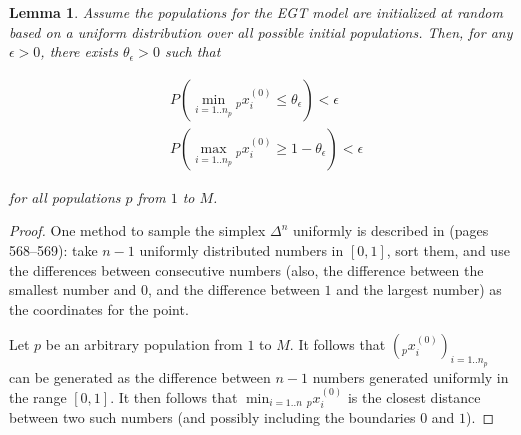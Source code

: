 \documentclass{sig-alt-full}
\newtheorem{lemma}{Lemma}
\begin{document}
\begin{multicols}{2}

\begin{lemma}
Assume the populations for the EGT model are initialized at random based on a uniform distribution over all possible initial populations.  Then, for any $\epsilon>0$, there exists $\theta_\epsilon>0$ such that

\begin{eqnarray}
& P\left( \min_{i=1..n_p} {_p}x^{(0)}_i \leq \theta_\epsilon \right) < \epsilon \label{ineq1}\\
& P\left( \max_{i=1..n_p} {_p}x^{(0)}_i \geq 1-\theta_\epsilon \right) < \epsilon \label{ineq2}
\end{eqnarray}

for all populations $p$ from $1$ to $M$.\end{lemma}

\begin{proof}
One method to sample the simplex $\Delta^n$ uniformly is described in \cite{devroye86nonuniform} (pages 568--569): take $n-1$ uniformly distributed numbers in $\left[0,1\right]$, sort them, and use the differences between consecutive numbers (also, the difference between the smallest number and $0$, and the difference between $1$ and the largest number) as the coordinates for the point.  

Let $p$ be an arbitrary population from $1$ to $M$.  It follows that %
$({_p}x^{(0)}_i)_{i=1..n_p}$
can be generated as the difference between $n-1$ numbers generated uniformly in the range $\left[0,1\right]$.  It then follows that $\min_{i=1..n} {_p}x^{(0)}_i$ is the closest distance between two such numbers (and possibly including the boundaries $0$ and $1$).


\end{proof}
\end{multicols}
\end{document}
